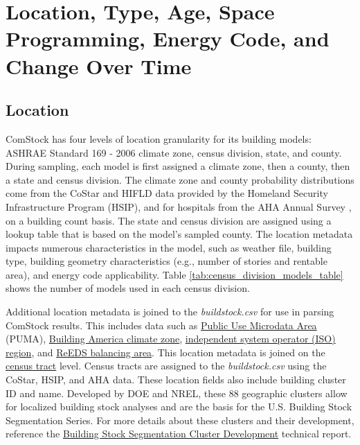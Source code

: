 \section{Location, Type, Age, Space Programming, Energy Code, and Change Over Time}
\subsection{Location} \label{sec:location}

ComStock has four levels of location granularity for its building models: ASHRAE Standard 169 - 2006 climate zone, census division, state, and county. During sampling, each model is first assigned a climate zone, then a county, then a state and census division. The climate zone and county probability distributions come from the CoStar and HIFLD data provided by the Homeland Security Infrastructure Program (HSIP), and for hospitals from the AHA Annual Survey \citep{aha_annual_survey_2022}, on a building count basis. The state and census division are assigned using a lookup table that is based on the model's sampled county. The location metadata impacts numerous characteristics in the model, such as weather file, building type, building geometry characteristics (e.g., number of stories and rentable area), and energy code applicability. Table  \ref{tab:census_division_models_table} shows the number of models used in each census division.

Additional location metadata is joined to the \emph{buildstock.csv} for use in parsing ComStock results. This includes data such as \href{https://www.census.gov/programs-surveys/geography/guidance/geo-areas/pumas.html}{Public Use Microdata Area} (PUMA), \href{https://www.energy.gov/eere/buildings/building-america-climate-specific-guidance}{Building America climate zone}, \href{https://isorto.org/}{independent system operator (ISO) region}, and \href{https://www.nrel.gov/analysis/reeds}{ReEDS balancing area}. This location metadata is joined on the \href{https://www2.census.gov/geo/pdfs/education/CensusTracts.pdf}{census tract} level. Census tracts are assigned to the \emph{buildstock.csv} using the CoStar, HSIP, and AHA data. These location fields also include building cluster ID and name. Developed by DOE and NREL, these 88 geographic clusters allow for localized building stock analyses and are the basis for the U.S. Building Stock Segmentation Series. For more details about these clusters and their development, reference the \href{https://www.nrel.gov/docs/fy23osti/84648.pdf}{Building Stock Segmentation Cluster Development} technical report.

